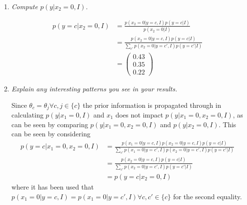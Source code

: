 \begin{example}
\begin{enumerate}
		\item \emph{Compute $p(y|x_2=0,I)$.}
		
		\begin{equation}
			\begin{split}
				p(y=c|x_2=0,I) & = \frac{p(x_2=0|y=c,I)p(y=c|I)}{p(x_2=0|I)}\\
				&= \frac{p(x_2=0|y=c,I)p(y=c|I)}{\sum_{c'}p(x_2=0|y=c',I)p(y=c'|I)}\\
				& = \begin{pmatrix}
					0.43 \\ 0.35\\ 0.22
				\end{pmatrix}
			\end{split}
		\end{equation}
		
		\item \emph{Explain any interesting patterns you see in your results.} \newline
		
		Since $\theta_c=\theta_j\forall c,j\in \{c\}$ the prior information is propagated through in calculating $p(y|x_1=0,I)$ and $x_1$ does not impact $p(y|x_1=0,x_2=0,I)$, as can be seen by comparing $p(y|x_1=0,x_2=0,I)$ and $p(y|x_2=0,I)$. This can be seen by considering
		\begin{equation}
			\begin{split}
				p(y=c|x_1=0,x_2=0,I) & = \frac{p(x_1=0|y=c,I)p(x_2=0|y=c,I)p(y=c|I)}{\sum_{c'}p(x_1=0|y=c',I)p(x_2=0|y=c',I)p(y=c'|I)}\\
				& = \frac{p(x_2=0|y=c,I)p(y=c|I)}{\sum_{c'}p(x_2=0|y=c',I)p(y=c'|I)}\\
				& = p(y=c|x_2=0,I)
			\end{split}
		\end{equation}
		where it has been used that $p(x_1=0|y=c,I) = p(x_1=0|y=c',I)\forall c,c'\in \{c\}$ for the second equality.
	\end{enumerate} 
\end{example}


